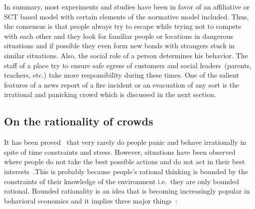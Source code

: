
In summary, most experiments and studies have been in favor of an affiliative or SCT based model with certain elements of the normative model included. Thus, the consensus is that people always try to escape while trying not to compete with each other and they look for familiar people or locations in dangerous situations and if possible they even form new bonds with strangers stuck in similar situations. Also, the social role of a person determines his behavior. The staff of a place try to ensure safe egress of customers and social leaders~(parents, teachers, etc.) take more responsibility during these times. One of the salient features of a news report of a fire incident or an evacuation of any sort is the irrational and panicking crowd which is discussed in the next section.

\subsection{On the rationality of crowds}
\label{LiteratureReview:RoleOfStress}

 It has been proved~\cite{Kobes:2009jx,Schadschneider:2008cz,Reicher:2008ep,Torres:2010tj,Paulsen:1984ti,Sime:1983uy} that very rarely do people panic and behave irrationally in spite of time constraints and stress. However, situations have been observed where people do not take the best possible actions and do not act in their best interests~\cite{Sandberg:1997tw}.This is probably because people's rational thinking is bounded by the constraints of their knowledge of the environment i.e.\ they are only bounded rational. Bounded rationality is an idea that is becoming increasingly popular in behavioral economics and it implies three major things~\cite{Jones:1999tn}:


